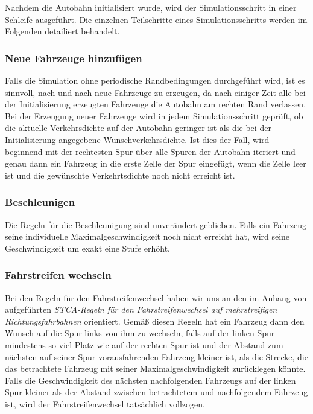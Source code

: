 \documentclass[11pt, a4paper]{article}
\newcommand\q[1]{\glqq{}#1\grqq{}}
\begin{document}
Nachdem die Autobahn initialisiert wurde, wird der Simulationsschritt in einer Schleife ausgeführt. Die einzelnen Teilschritte eines Simulationsschritts werden im Folgenden detailiert behandelt.


\subsubsection{Neue Fahrzeuge hinzufügen}
\label{subsubsec:neueFahrzeuge}

Falls die Simulation ohne periodische Randbedingungen durchgeführt wird, ist es sinnvoll, nach und nach neue Fahrzeuge zu erzeugen, da nach einiger Zeit alle bei der Initialisierung erzeugten Fahrzeuge die Autobahn am rechten Rand verlassen. Bei der Erzeugung neuer Fahrzeuge wird in jedem Simulationsschritt geprüft, ob die aktuelle Verkehrsdichte auf der Autobahn geringer ist als die bei der Initialisierung angegebene Wunschverkehrsdichte. Ist dies der Fall, wird beginnend mit der rechtesten Spur über alle Spuren der Autobahn iteriert und genau dann ein Fahrzeug in die erste Zelle der Spur eingefügt, wenn die Zelle leer ist und die gewünschte Verkehrtsdichte noch nicht erreicht ist.

\subsubsection{Beschleunigen}
\label{subsubsec:beschleunigen}

Die Regeln für die Beschleunigung sind unverändert geblieben. Falls ein Fahrzeug seine individuelle Maximalgeschwindigkeit noch nicht erreicht hat, wird seine Geschwindigkeit um exakt eine Stufe erhöht.

\subsubsection{Fahrstreifen wechseln}
\label{subsubsec:fahrstreifenWechseln}

Bei den Regeln für den Fahrstreifenwechsel haben wir uns an den im Anhang von \cite{mehrspurig} aufgeführten \emph{\q{STCA-Regeln für den Fahrstreifenwechsel auf mehrstreifigen Richtungsfahrbahnen}} orientiert. Gemäß diesen Regeln hat ein Fahrzeug dann den Wunsch auf die Spur links von ihm zu wechseln, falls auf der linken Spur mindestens so viel Platz wie auf der rechten Spur ist und der Abstand zum nächsten auf seiner Spur vorausfahrenden Fahrzeug kleiner ist, als die Strecke, die das betrachtete Fahrzeug mit seiner Maximalgeschwindigkeit zurücklegen könnte. Falls die Geschwindigkeit des nächsten nachfolgenden Fahrzeugs auf der linken Spur kleiner als der Abstand zwischen betrachtetem und nachfolgendem Fahrzeug ist, wird der Fahrstreifenwechsel tatsächlich vollzogen.
\end{document}
